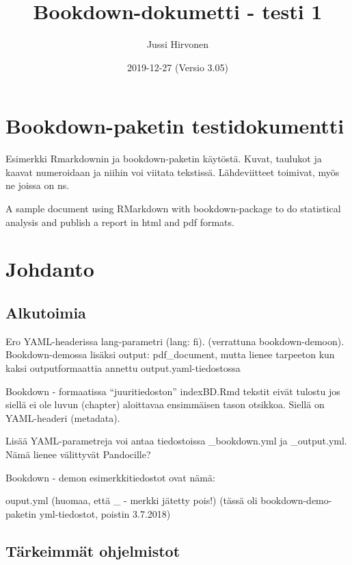 \documentclass[
  finnish,
]{book}
\title{Bookdown-dokumetti - testi 1}
\author{Jussi Hirvonen}
\date{2019-12-27 (Versio 3.05)}
\begin{document}
\frontmatter
\maketitle

{
\setcounter{tocdepth}{1}
\tableofcontents
}
\mainmatter
\hypertarget{bookdown-paketin-testidokumentti}{%
\chapter{Bookdown-paketin testidokumentti}\label{bookdown-paketin-testidokumentti}}

Esimerkki Rmarkdownin ja bookdown-paketin käytöstä. Kuvat, taulukot ja kaavat numeroidaan ja niihin voi viitata tekstissä. Lähdeviitteet toimivat, myös ne joissa on ns.

A sample document using RMarkdown with bookdown-package to do statistical analysis and publish a report in html and pdf formats.

\hypertarget{johdanto}{%
\chapter{Johdanto}\label{johdanto}}

\hypertarget{alkutoimia}{%
\section{Alkutoimia}\label{alkutoimia}}

Ero YAML-headerissa lang-parametri (lang: fi). (verrattuna bookdown-demoon).
Bookdown-demossa lisäksi output: pdf\_document, mutta lienee tarpeeton kun kaksi outputformaattia annettu output.yaml-tiedostossa

Bookdown - formaatissa ``juuritiedoston'' indexBD.Rmd tekstit eivät tulostu jos siellä ei ole luvun (chapter) aloittavaa ensimmäisen tason otsikkoa. Siellä on YAML-headeri (metadata).

Lisää YAML-parametreja voi antaa tiedostoissa \_bookdown.yml ja \_output.yml. Nämä lienee välittyvät Pandocille?

Bookdown - demon esimerkkitiedostot ovat nämä:

ouput.yml (huomaa, että \_ - merkki jätetty pois!) (tässä oli bookdown-demo-paketin yml-tiedostot, poistin 3.7.2018)

\hypertarget{tuxe4rkeimmuxe4t-ohjelmistot}{%
\section{Tärkeimmät ohjelmistot}\label{tuxe4rkeimmuxe4t-ohjelmistot}}
\end{document}
